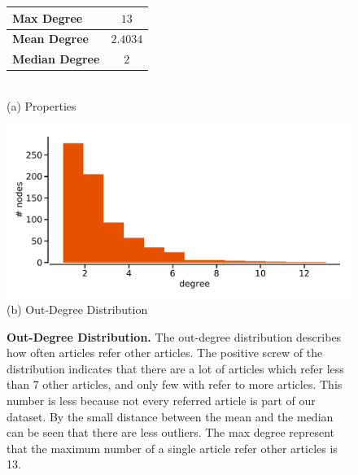 \begin{figure}[!t]
  \begin{minipage}[!t]{\textwidth}
    \begin{minipage}[b]{0.39\textwidth}
      \centering
      \begin{tabular}{ l c }
        \toprule
        \textbf{Max Degree}    & $13$     \\ \midrule
        \textbf{Mean Degree}   & $2.4034$ \\ \midrule
        \textbf{Median Degree} & $2$      \\
        \bottomrule
    \end{tabular} \\
    \vspace*{1cm}
    (a) Properties
  \end{minipage}
  \begin{minipage}[b]{0.59\textwidth}
    \centering
    \includegraphics[width=1.0\textwidth]{figures/out-degree_distribution} \\
    (b) Out-Degree Distribution
    \end{minipage}
  \end{minipage}
\caption[Out-Degree Distribution of the Citation Network]{\textbf{Out-Degree Distribution.} The out-degree distribution describes how often articles refer other articles. The positive screw of the distribution indicates that there are a lot of articles which refer less than 7 other articles, and only few with refer to more articles. This number is less because not every referred article is part of our dataset. By the small distance between the mean and the median can be seen that there are less outliers. The max degree represent that the maximum number of a single article refer other articles is 13.}
\label{fig:outdegree_distribution}
\end{figure}

